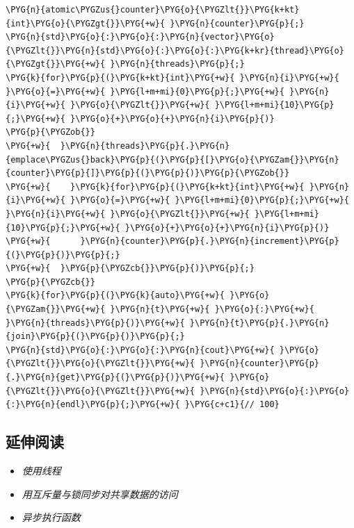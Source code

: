 \begin{codeblockbg}
\begin{Verbatim}[commandchars=\\\{\},breaklines=true,breakanywhere=true,fontsize=\codefont,xleftmargin=17bp]
\PYG{n}{atomic\PYGZus{}counter}\PYG{o}{\PYGZlt{}}\PYG{k+kt}{int}\PYG{o}{\PYGZgt{}}\PYG{+w}{ }\PYG{n}{counter}\PYG{p}{;}
\PYG{n}{std}\PYG{o}{:}\PYG{o}{:}\PYG{n}{vector}\PYG{o}{\PYGZlt{}}\PYG{n}{std}\PYG{o}{:}\PYG{o}{:}\PYG{k+kr}{thread}\PYG{o}{\PYGZgt{}}\PYG{+w}{ }\PYG{n}{threads}\PYG{p}{;}
\PYG{k}{for}\PYG{p}{(}\PYG{k+kt}{int}\PYG{+w}{ }\PYG{n}{i}\PYG{+w}{ }\PYG{o}{=}\PYG{+w}{ }\PYG{l+m+mi}{0}\PYG{p}{;}\PYG{+w}{ }\PYG{n}{i}\PYG{+w}{ }\PYG{o}{\PYGZlt{}}\PYG{+w}{ }\PYG{l+m+mi}{10}\PYG{p}{;}\PYG{+w}{ }\PYG{o}{+}\PYG{o}{+}\PYG{n}{i}\PYG{p}{)}
\PYG{p}{\PYGZob{}}
\PYG{+w}{  }\PYG{n}{threads}\PYG{p}{.}\PYG{n}{emplace\PYGZus{}back}\PYG{p}{(}\PYG{p}{[}\PYG{o}{\PYGZam{}}\PYG{n}{counter}\PYG{p}{]}\PYG{p}{(}\PYG{p}{)}\PYG{p}{\PYGZob{}}
\PYG{+w}{    }\PYG{k}{for}\PYG{p}{(}\PYG{k+kt}{int}\PYG{+w}{ }\PYG{n}{i}\PYG{+w}{ }\PYG{o}{=}\PYG{+w}{ }\PYG{l+m+mi}{0}\PYG{p}{;}\PYG{+w}{ }\PYG{n}{i}\PYG{+w}{ }\PYG{o}{\PYGZlt{}}\PYG{+w}{ }\PYG{l+m+mi}{10}\PYG{p}{;}\PYG{+w}{ }\PYG{o}{+}\PYG{o}{+}\PYG{n}{i}\PYG{p}{)}
\PYG{+w}{      }\PYG{n}{counter}\PYG{p}{.}\PYG{n}{increment}\PYG{p}{(}\PYG{p}{)}\PYG{p}{;}
\PYG{+w}{  }\PYG{p}{\PYGZcb{}}\PYG{p}{)}\PYG{p}{;}
\PYG{p}{\PYGZcb{}}
\PYG{k}{for}\PYG{p}{(}\PYG{k}{auto}\PYG{+w}{ }\PYG{o}{\PYGZam{}}\PYG{+w}{ }\PYG{n}{t}\PYG{+w}{ }\PYG{o}{:}\PYG{+w}{ }\PYG{n}{threads}\PYG{p}{)}\PYG{+w}{ }\PYG{n}{t}\PYG{p}{.}\PYG{n}{join}\PYG{p}{(}\PYG{p}{)}\PYG{p}{;}
\PYG{n}{std}\PYG{o}{:}\PYG{o}{:}\PYG{n}{cout}\PYG{+w}{ }\PYG{o}{\PYGZlt{}}\PYG{o}{\PYGZlt{}}\PYG{+w}{ }\PYG{n}{counter}\PYG{p}{.}\PYG{n}{get}\PYG{p}{(}\PYG{p}{)}\PYG{+w}{ }\PYG{o}{\PYGZlt{}}\PYG{o}{\PYGZlt{}}\PYG{+w}{ }\PYG{n}{std}\PYG{o}{:}\PYG{o}{:}\PYG{n}{endl}\PYG{p}{;}\PYG{+w}{ }\PYG{c+c1}{// 100}
\end{Verbatim}
\end{codeblockbg}



\subsection{延伸阅读}



\begin{itemize}
\item \textit{使用线程}



\item \textit{用互斥量与锁同步对共享数据的访问}



\item \textit{异步执行函数}

\end{itemize}


